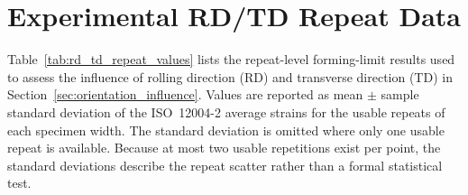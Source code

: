 \chapter{Experimental RD/TD Repeat Data}
\label{app:rd_td_repeat_data}

Table~\ref{tab:rd_td_repeat_values} lists the repeat-level forming-limit
results used to assess the influence of rolling direction (RD) and transverse
direction (TD) in Section~\ref{sec:orientation_influence}. Values are reported
as mean $\pm$ sample standard deviation of the ISO~12004-2 average strains for the
usable repeats of each specimen width. The standard deviation is omitted where
only one usable repeat is available. Because at most two usable repetitions
exist per point, the standard deviations describe the repeat scatter rather
than a formal statistical test.

